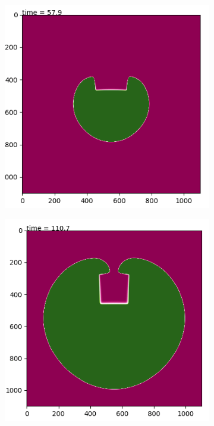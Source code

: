 \documentclass[11pt]{article}
\begin{document}
\begin{figure}[hbt!]
\begin{subfigure}[b]{0.45\textwidth}
\includegraphics[width=\textwidth]{Images/rho2d1.png}
\end{subfigure}
\begin{subfigure}[b]{0.45\textwidth}
\includegraphics[width=\textwidth]{Images/rho2d2.png}

\end{subfigure}
\end{figure}
\end{document}
